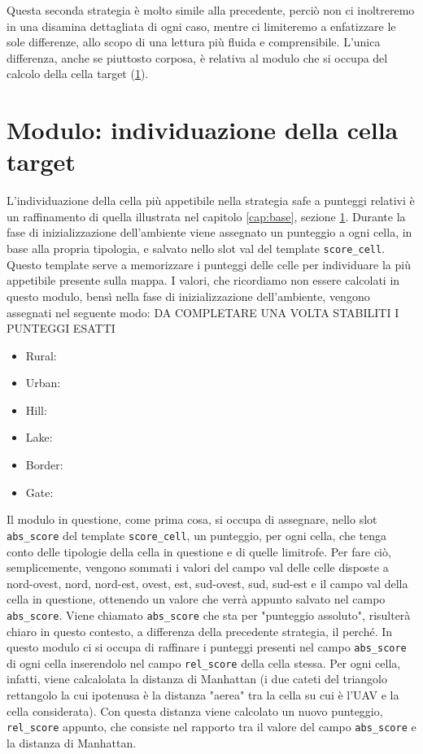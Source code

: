 Questa seconda strategia è molto simile alla precedente, perciò non ci inoltreremo in una disamina dettagliata di ogni caso, mentre ci limiteremo a enfatizzare le sole differenze, allo scopo di una lettura più fluida e comprensibile. L'unica differenza, anche se piuttosto corposa, è relativa al modulo che si occupa del calcolo della cella target (\ref{sec:safe-target}).

\section{Modulo: individuazione della cella target} \label{sec:safe-target}
L'individuazione della cella più appetibile nella strategia safe a punteggi relativi è un raffinamento di quella illustrata nel capitolo \ref{cap:base}, sezione \ref{sec:safe-target}. Durante la fase di inizializzazione dell'ambiente viene assegnato un punteggio a ogni cella, in base alla propria tipologia, e salvato nello slot val del template \texttt{score\_cell}. Questo template serve a memorizzare i punteggi delle celle per individuare la più appetibile presente sulla mappa. I valori, che ricordiamo non essere calcolati in questo modulo, bensì nella fase di inizializzazione dell'ambiente, vengono assegnati nel seguente modo: {\color{red}DA COMPLETARE UNA VOLTA STABILITI I PUNTEGGI ESATTI}
\begin{itemize}
	\item Rural: 
	\item Urban: 
	\item Hill: 
	\item Lake: 
	\item Border: 
	\item Gate: 	
\end{itemize}
Il modulo in questione, come prima cosa, si occupa di assegnare, nello slot \texttt{abs\_score} del template \texttt{score\_cell}, un punteggio, per ogni cella, che tenga conto delle tipologie della cella in questione e di quelle limitrofe. Per fare ciò, semplicemente, vengono sommati i valori del campo val delle celle disposte a nord-ovest, nord, nord-est, ovest, est, sud-ovest, sud, sud-est e il campo val della cella in questione, ottenendo un valore che verrà appunto salvato nel campo \texttt{abs\_score}. Viene chiamato \texttt{abs\_score} che sta per "punteggio assoluto", risulterà chiaro in questo contesto, a differenza della precedente strategia, il perché.
In questo modulo ci si occupa di raffinare i punteggi presenti nel campo \texttt{abs\_score} di ogni cella inserendolo nel campo \texttt{rel\_score} della cella stessa. Per ogni cella, infatti, viene calcalolata la distanza di Manhattan (i due cateti del triangolo rettangolo la cui ipotenusa è la distanza "aerea" tra la cella su cui è l'UAV e la cella considerata). Con questa distanza viene calcolato un nuovo punteggio, \texttt{rel\_score} appunto, che consiste nel rapporto tra il valore del campo \texttt{abs\_score} e la distanza di Manhattan.
